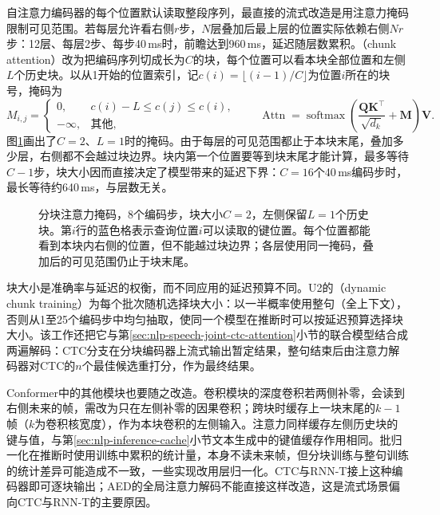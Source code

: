 自注意力编码器的每个位置默认读取整段序列，最直接的流式改造是用注意力掩码限制可见范围。若每层允许看右侧$r$步，$N$层叠加后最上层的位置实际依赖右侧$Nr$步：12层、每层2步、每步40\,ms时，前瞻达到960\,ms，延迟随层数累积。（chunk attention）改为把编码序列切成长为$C$的块，每个位置可以看本块全部位置和左侧$L$个历史块。以从1开始的位置索引，记$c(i)=\lfloor(i-1)/C\rfloor$为位置$i$所在的块号，掩码为
\begin{equation}
 M_{i,j}=\begin{cases}
   0, & c(i)-L\leq c(j)\leq c(i),\\
   -\infty, & \text{其他},
 \end{cases}
 \qquad
 \operatorname{Attn}=\operatorname{softmax}\!\left(\frac{\bm{Q}\bm{K}^{\top}}{\sqrt{d_k}}+\bm{M}\right)\bm{V}.
 \label{eq:nlp-speech-chunk-mask}
\end{equation}
图\ref{fig:nlp-speech-chunk-mask}画出了$C=2$、$L=1$时的掩码。由于每层的可见范围都止于本块末尾，叠加多少层，右侧都不会越过块边界。块内第一个位置要等到块末尾才能计算，最多等待$C-1$步，块大小因而直接决定了模型带来的延迟下界：$C=16$个40\,ms编码步时，最长等待约640\,ms，与层数无关。

\begin{figure}[htbp]
  \centering
  
  \caption{分块注意力掩码，8个编码步，块大小$C=2$，左侧保留$L=1$个历史块。第$i$行的蓝色格表示查询位置$i$可以读取的键位置。每个位置都能看到本块内右侧的位置，但不能越过块边界；各层使用同一掩码，叠加后的可见范围仍止于块末尾。}
  \label{fig:nlp-speech-chunk-mask}
\end{figure}

块大小是准确率与延迟的权衡，而不同应用的延迟预算不同。U2的（dynamic chunk training）为每个批次随机选择块大小：以一半概率使用整句（全上下文），否则从1至25个编码步中均匀抽取，使同一个模型在推断时可以按延迟预算选择块大小。该工作还把它与第\ref{sec:nlp-speech-joint-ctc-attention}小节的联合模型结合成两遍解码：CTC分支在分块编码器上流式输出暂定结果，整句结束后由注意力解码器对CTC的$n$个最佳候选重打分，作为最终结果。

Conformer中的其他模块也要随之改造。卷积模块的深度卷积若两侧补零，会读到右侧未来的帧，需改为只在左侧补零的因果卷积；跨块时缓存上一块末尾的$k-1$帧（$k$为卷积核宽度），作为本块卷积的左侧输入。注意力同样缓存左侧历史块的键与值，与第\ref{sec:nlp-inference-cache}小节文本生成中的键值缓存作用相同。批归一化在推断时使用训练中累积的统计量，本身不读未来帧，但分块训练与整句训练的统计差异可能造成不一致，一些实现改用层归一化。CTC与RNN-T接上这种编码器即可逐块输出；AED的全局注意力解码不能直接这样改造，这是流式场景偏向CTC与RNN-T的主要原因。

